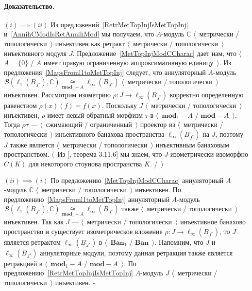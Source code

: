 \documentclass[12pt]{article}
\newcommand{\isom}[1]{\mathop{\mathbin{\cong}}\limits_{#1}}
\renewenvironment{proof}{\paragraph{Доказательство.}}{\hfill$\square$\medskip}
\begin{document}
\begin{proof} $(i)\implies (ii)$  Из предложений~\ref{RetrMetTopInjIsMetTopInj}
    и~\ref{AnnihCModIsRetAnnihMod} мы получаем, что $A$-модуль $\mathbb{C}$
    $\langle$~метрически / топологически~$\rangle$ инъективен как ретракт
    $\langle$~метрически / топологически~$\rangle$ инъективного модуля $J$.
    Предложение~\ref{MetTopInjModCCharac} дает нам, что $\langle$~$A= \{0 \}$ /
    $A$ имеет правую ограниченную аппроксимативную единицу~$\rangle$. Из
    предложения~\ref{MapsFroml1toMetTopInj} следует, что аннуляторный $A$-модуль
    $\mathcal{B}(\ell_1(B_{J^*}),\mathbb{C})
        \isom{\mathbf{mod}_1-A}\ell_\infty(B_{J^*})$
    $\langle$~метрически / топологически~$\rangle$ инъективен. Рассмотрим
    изометрию $\rho:J\to\ell_\infty(B_{J^*})$ корректно определенную равенством
    $\rho(x)(f)=f(x)$. Поскольку $J$ $\langle$~метрически /
    топологически~$\rangle$ инъективен, $\rho$ имеет левый обратный морфизм
    $\tau$ в $\langle$~$\mathbf{mod}_1-A$ / $\mathbf{mod}-A$~$\rangle$. Тогда
    $\rho\tau$ --- $\langle$~сжимающий / ограниченный~$\rangle$ проектор из
    $\langle$~метрически / топологически~$\rangle$ инъективного банахова
    пространства $\ell_\infty(B_{J^*})$ на $J$, поэтому $J$ также является
    $\langle$~метрически / топологически~$\rangle$ инъективным банаховым
    пространством. $\langle$~Из [\cite{LaceyIsomThOfClassicBanSp}, теорема
    3.11.6] мы знаем, что $J$ изометрически изоморфно $C(K)$ для некоторого
    стоунова пространства $K$. /~$\rangle$

    $(ii)\implies (i)$ По предложению~\ref{MetTopInjModCCharac} аннуляторный
    $A$-модуль $\mathbb{C}$ $\langle$~метрически / топологически~$\rangle$
    инъективен. По предложению~\ref{MapsFroml1toMetTopInj} аннуляторный
    $A$-модуль
    $\mathcal{B}(\ell_1(B_{J^*}),\mathbb{C})
        \isom{\mathbf{mod}_1-A}\ell_\infty(B_{J^*})$
    также $\langle$~метрически / топологически~$\rangle$ инъективен. Так как $J$
    --- $\langle$~метрически / топологически~$\rangle$ инъективное банахово
    пространство и существует изометрическое вложение 
    $\rho:J\to \ell_\infty(B_{J^*})$, то $J$ является ретрактом 
    $\ell_\infty(B_{J^*})$ в 
    $\langle$~$\mathbf{Ban}_1$ / $\mathbf{Ban}$~$\rangle$. Напомним, что $J$ и
    $\ell_\infty(B_{J^*})$ аннуляторные модули, поэтому данная ретракция также
    является ретракцией в $\langle$~$\mathbf{mod}_1-A$ /
    $\mathbf{mod}-A$~$\rangle$. По предложению~\ref{RetrMetTopInjIsMetTopInj}
    $A$-модуль $J$ $\langle$~метрически / топологически~$\rangle$ инъективен.
\end{proof}
\end{document}
